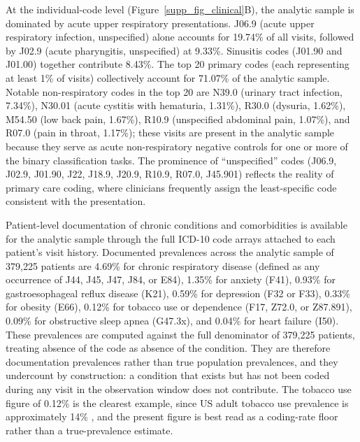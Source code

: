 \documentclass[utf8]{frontiers_suppmat} %
\begin{document}
At the individual-code level (Figure~\ref{supp_fig_clinical}B), the analytic sample is dominated by acute upper respiratory presentations. J06.9 (acute upper respiratory infection, unspecified) alone accounts for 19.74\% of all visits, followed by J02.9 (acute pharyngitis, unspecified) at 9.33\%. Sinusitis codes (J01.90 and J01.00) together contribute 8.43\%. The top 20 primary codes (each representing at least 1\% of visits) collectively account for 71.07\% of the analytic sample. Notable non-respiratory codes in the top 20 are N39.0 (urinary tract infection, 7.34\%), N30.01 (acute cystitis with hematuria, 1.31\%), R30.0 (dysuria, 1.62\%), M54.50 (low back pain, 1.67\%), R10.9 (unspecified abdominal pain, 1.07\%), and R07.0 (pain in throat, 1.17\%); these visits are present in the analytic sample because they serve as acute non-respiratory negative controls for one or more of the binary classification tasks. The prominence of ``unspecified'' codes (J06.9, J02.9, J01.90, J22, J18.9, J20.9, R10.9, R07.0, J45.901) reflects the reality of primary care coding, where clinicians frequently assign the least-specific code consistent with the presentation.

Patient-level documentation of chronic conditions and comorbidities is available for the analytic sample through the full ICD-10 code arrays attached to each patient's visit history. Documented prevalences across the analytic sample of 379{,}225 patients are 4.69\% for chronic respiratory disease (defined as any occurrence of J44, J45, J47, J84, or E84), 1.35\% for anxiety (F41), 0.93\% for gastroesophageal reflux disease (K21), 0.59\% for depression (F32 or F33), 0.33\% for obesity (E66), 0.12\% for tobacco use or dependence (F17, Z72.0, or Z87.891), 0.09\% for obstructive sleep apnea (G47.3x), and 0.04\% for heart failure (I50). These prevalences are computed against the full denominator of 379{,}225 patients, treating absence of the code as absence of the condition. They are therefore documentation prevalences rather than true population prevalences, and they undercount by construction: a condition that exists but has not been coded during any visit in the observation window does not contribute. The tobacco use figure of 0.12\% is the clearest example, since US adult tobacco use prevalence is approximately 14\% \citep{cdc-nhis-tobacco-prevalence}, and the present figure is best read as a coding-rate floor rather than a true-prevalence estimate.
\end{document}
